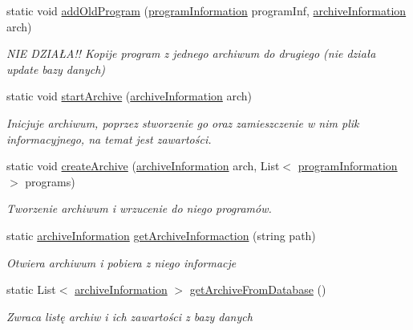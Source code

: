 \begin{DoxyCompactItemize}
static void \hyperlink{class_smart__install_1_1control_af2587a0acd7323de3d9f1c89688a0415}{add\+Old\+Program} (\hyperlink{class_smart__install_1_1program_information}{program\+Information} program\+Inf, \hyperlink{class_smart__install_1_1archive_information}{archive\+Information} arch)
\begin{DoxyCompactList}\small\item\em N\+I\+E D\+Z\+I\+AŁ\+A!! Kopije program z jednego archiwum do drugiego (nie działa update bazy danych) \end{DoxyCompactList}\item 
static void \hyperlink{class_smart__install_1_1control_a54719a159439fbd3b9da19e076e26f6c}{start\+Archive} (\hyperlink{class_smart__install_1_1archive_information}{archive\+Information} arch)
\begin{DoxyCompactList}\small\item\em Inicjuje archiwum, poprzez stworzenie go oraz zamieszczenie w nim plik informacyjnego, na temat jest zawartości. \end{DoxyCompactList}\item 
static void \hyperlink{class_smart__install_1_1control_a681ffeb9001086a6c7f4cc252e55008a}{create\+Archive} (\hyperlink{class_smart__install_1_1archive_information}{archive\+Information} arch, List$<$ \hyperlink{class_smart__install_1_1program_information}{program\+Information} $>$ programs)
\begin{DoxyCompactList}\small\item\em Tworzenie archiwum i wrzucenie do niego programów. \end{DoxyCompactList}\item 
static \hyperlink{class_smart__install_1_1archive_information}{archive\+Information} \hyperlink{class_smart__install_1_1control_a2a5adfbe7bc444a2cb04151e0118dcb7}{get\+Archive\+Informaction} (string path)
\begin{DoxyCompactList}\small\item\em Otwiera archiwum i pobiera z niego informacje \end{DoxyCompactList}\item 
static List$<$ \hyperlink{class_smart__install_1_1archive_information}{archive\+Information} $>$ \hyperlink{class_smart__install_1_1control_aa8fd1c1485954262cc028e14cb78d8e1}{get\+Archive\+From\+Database} ()
\begin{DoxyCompactList}\small\item\em Zwraca listę archiw i ich zawartości z bazy danych \end{DoxyCompactList}\end{DoxyCompactItemize}


